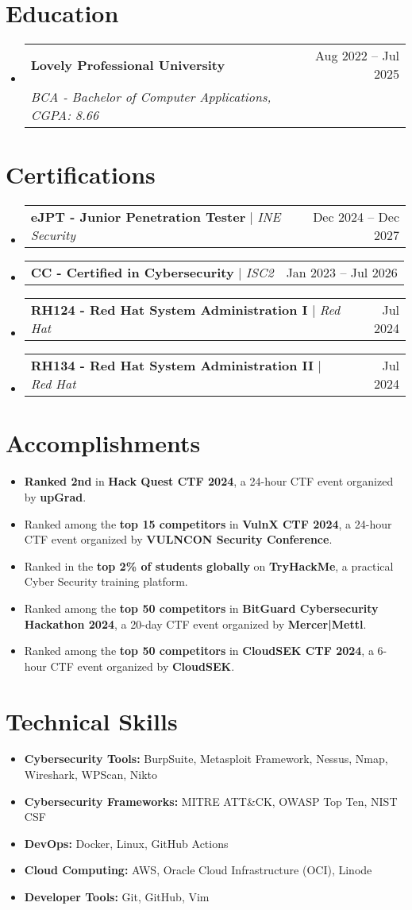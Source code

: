 \documentclass[letterpaper,12pt]{article}
\newcommand{\resumeItem}[1]{
  \item[--]\small{#1} %
}
\newcommand{\resumeSubheading}[4]{
  \item \vspace{1pt}
    \begin{tabularx}{\textwidth}{Xr}
      \textbf{#1} & #2 \\
      \textit{\small#3} & \textit{\small #4} \\
    \end{tabularx} \vspace{1pt}
}
\newcommand{\resumeCertHeading}[2]{
    \item
    \begin{tabularx}{\textwidth}{Xr}
      \small#1 & #2 \\
    \end{tabularx}
}
\newcommand{\resumeItemListStart}{\begin{itemize}[topsep=1pt, itemsep=1pt, leftmargin=0.2in]}
\newcommand{\resumeItemListEnd}{\end{itemize} \vspace{1pt}}
\newcommand{\resumeSubHeadingListStart}{\begin{itemize}[leftmargin=0.15in, label={}, topsep=2pt]}
\newcommand{\resumeSubHeadingListEnd}{\end{itemize}}
\begin{document}

\section{Education}
  \resumeSubHeadingListStart
    \resumeSubheading
      {Lovely Professional University}{Aug 2022 -- Jul 2025}
      {BCA - Bachelor of Computer Applications, CGPA: 8.66}{}
  \resumeSubHeadingListEnd


\section{Certifications}
  \resumeSubHeadingListStart
    \resumeCertHeading
      {\textbf{eJPT - Junior Penetration Tester} $|$ \emph{INE Security}}{Dec 2024 -- Dec 2027}
    \resumeCertHeading
      {\textbf{CC - Certified in Cybersecurity} $|$ \emph{ISC2}}{Jan 2023 -- Jul 2026}
    \resumeCertHeading
      {\textbf{RH124 - Red Hat System Administration I} $|$ \emph{Red Hat}}{Jul 2024}
    \resumeCertHeading
      {\textbf{RH134 - Red Hat System Administration II} $|$ \emph{Red Hat}}{Jul 2024}
  \resumeSubHeadingListEnd


\section{Accomplishments}
\resumeItemListStart
    \resumeItem{\textbf{Ranked 2nd} in \textbf{Hack Quest CTF 2024}, a 24-hour CTF event organized by \textbf{upGrad}.}
    \resumeItem{Ranked among the \textbf{top 15 competitors} in \textbf{VulnX CTF 2024}, a 24-hour CTF event organized by \textbf{VULNCON Security Conference}.}
    \resumeItem{Ranked in the \textbf{top 2\% of students globally} on \textbf{TryHackMe}, a practical Cyber Security training platform.}
    \resumeItem{Ranked among the \textbf{top 50 competitors} in \textbf{BitGuard Cybersecurity Hackathon 2024}, a 20-day CTF event organized by \textbf{Mercer|Mettl}.}
    \resumeItem{Ranked among the \textbf{top 50 competitors} in \textbf{CloudSEK CTF 2024}, a 6-hour CTF event organized by \textbf{CloudSEK}.}
\resumeItemListEnd


\section{Technical Skills}
  \resumeItemListStart
    \resumeItem{\textbf{Cybersecurity Tools:} BurpSuite, Metasploit Framework, Nessus, Nmap, Wireshark, WPScan, Nikto}
    \resumeItem{\textbf{Cybersecurity Frameworks:} MITRE ATT\&CK, OWASP Top Ten, NIST CSF}
    \resumeItem{\textbf{DevOps:} Docker, Linux, GitHub Actions}
    \resumeItem{\textbf{Cloud Computing:} AWS, Oracle Cloud Infrastructure (OCI), Linode}
    \resumeItem{\textbf{Developer Tools:} Git, GitHub, Vim}
  \resumeItemListEnd
\end{document}
